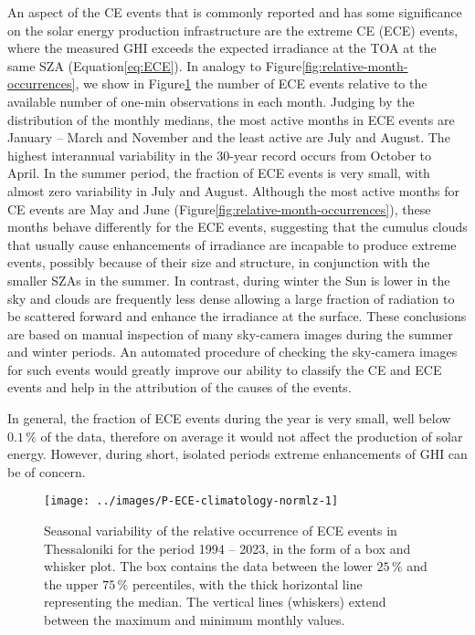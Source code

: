 \documentclass[preprint, 5p,
authoryear]{elsarticle} %
\begin{document}
An aspect of the CE events that is commonly reported and has some
significance on the solar energy production infrastructure are the
extreme CE (ECE) events, where the measured GHI exceeds the expected
irradiance at the TOA at the same SZA
(Equation\nobreakspace{}\ref{eq:ECE}). In analogy to
Figure\nobreakspace{}\ref{fig:relative-month-occurrences}, we show in
Figure\nobreakspace{}\ref{fig:relative-month-occurancies-ECE} the number
of ECE events relative to the available number of one-min observations
in each month. Judging by the distribution of the monthly medians, the
most active months in ECE events are January -- March and November and
the least active are July and August. The highest interannual
variability in the 30-year record occurs from October to April. In the
summer period, the fraction of ECE events is very small, with almost
zero variability in July and August. Although the most active months for
CE events are May and June
(Figure\nobreakspace{}\ref{fig:relative-month-occurrences}), these
months behave differently for the ECE events, suggesting that the
cumulus clouds that usually cause enhancements of irradiance are
incapable to produce extreme events, possibly because of their size and
structure, in conjunction with the smaller SZAs in the summer. In
contrast, during winter the Sun is lower in the sky and clouds are
frequently less dense allowing a large fraction of radiation to be
scattered forward and enhance the irradiance at the surface. These
conclusions are based on manual inspection of many sky-camera images
during the summer and winter periods. An automated procedure of checking
the sky-camera images for such events would greatly improve our ability
to classify the CE and ECE events and help in the attribution of the
causes of the events.

In general, the fraction of ECE events during the year is very small,
well below \(0.1\,\%\) of the data, therefore on average it would not
affect the production of solar energy. However, during short, isolated
periods extreme enhancements of GHI can be of concern.

\begin{figure}

{\centering \texttt{[image: ../images/P-ECE-climatology-normlz-1]} 

}

\caption{Seasonal variability of the relative occurrence of ECE events in Thessaloniki for the period 1994 -- 2023, in the form of a box and whisker plot. The box contains the data between the lower $25\,\%$ and the upper $75\,\%$ percentiles, with the thick horizontal line representing the median. The vertical lines (whiskers) extend between the maximum and minimum monthly values.}\label{fig:relative-month-occurancies-ECE}
\end{figure}
\end{document}
